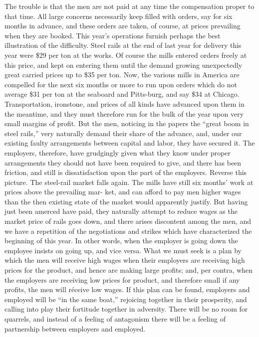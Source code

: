 \documentclass[11pt,openany]{book}
\begin{document}
The trouble is that the men are not paid at any time the compensation proper to that time. All large concerns necessarily keep filled with orders, say for six months in advance, and these orders are taken, of course, at prices prevailing when they are booked. This year's operations furnish perhaps the best illustration of the difficulty. Steel rails at the end of last year for delivery this year were \$29 per ton at the works. Of course the mills entered orders freely at this price, and kept on entering them until the demand growing unexpectedly great carried prices up to \$35 per ton. Now, the various mills in America are compelled for the next six months or more to run upon orders which do not average \$31 per ton at the seaboard and Pitts-burg, and say \$34 at Chicago. Transportation, ironstone, and prices of all kinds have advanced upon them in the meantime, and they must therefore run for the bulk of the year upon very small margins of profit. But the men, noticing in the papers the ``great boom in steel rails,'' very naturally demand their share of the advance, and, under our existing faulty arrangements between capital and labor, they have secured it. The employers, therefore, have grudgingly given what they know under proper arrangements they should not have been required to give, and there has been friction, and still is dissatisfaction upon the part of the employers. Reverse this picture. The steel-rail market falls again. The mills have still six months' work at prices above the prevailing mar- ket, and can afford to pay men higher wages than the then existing state of the market would apparently justify. But having just been amerced have paid, they naturally attempt to reduce wages as the market price of rails goes down, and there arises discontent among the men, and we have a repetition of the negotiations and strikes which have characterized the beginning of this year. In other words, when the employer is going down the employee insists on going up, and vice versa. What we must seek is a plan by which the men will receive high wages when their employers are receiving high prices for the product, and hence are making large profits; and, per contra, when the employers are receiving low prices for product, and therefore small if any profits, the men will réceive low wages. If this plan can be found, employers and employed will be ``in the same boat,'' rejoicing together in their prosperity, and calling into play their fortitude together in adversity. There will be no room for quarrels, and instead of a feeling of antagonism there will be a feeling of partnership between employers and employed.
\end{document}
